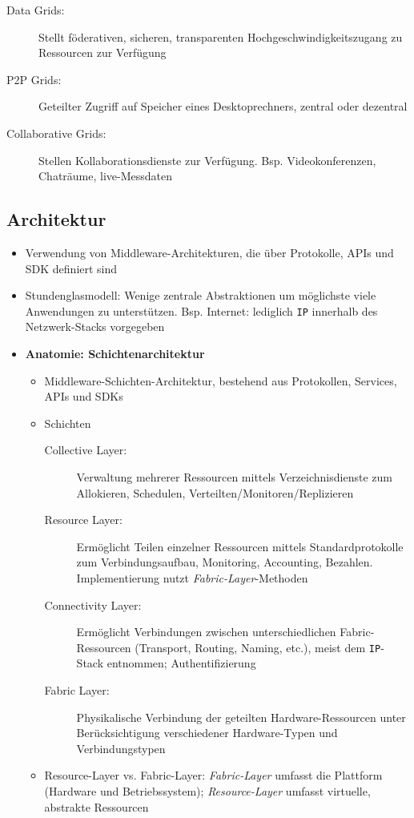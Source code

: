 \begin{itemize}
\begin{description}
		\item[Data Grids:] Stellt föderativen, sicheren, transparenten Hochgeschwindigkeitszugang zu Ressourcen zur Verfügung 
		\item[P2P Grids:] Geteilter Zugriff auf Speicher eines Desktoprechners, zentral oder dezentral
		\item[Collaborative Grids:] Stellen Kollaborationsdienste zur Verfügung. Bsp. Videokonferenzen, Chaträume, live-Messdaten
	\end{description}
\end{itemize}


\subsection{Architektur}
\begin{itemize}
	\item Verwendung von Middleware-Architekturen, die über Protokolle, APIs und SDK definiert sind
	\item Stundenglasmodell: Wenige zentrale Abstraktionen um möglichste viele Anwendungen zu unterstützen. Bsp. Internet: lediglich \texttt{IP} innerhalb des Netzwerk-Stacks vorgegeben
	\item \textbf{Anatomie: Schichtenarchitektur}
	\begin{itemize}
		\item Middleware-Schichten-Architektur, bestehend aus Protokollen, Services, APIs und SDKs
		\item Schichten
		\begin{description}
			\item[Collective Layer:] Verwaltung mehrerer Ressourcen mittels Verzeichnisdienste zum Allokieren, Schedulen, Verteilten/Monitoren/Replizieren
			\item[Resource Layer:] Ermöglicht Teilen einzelner Ressourcen mittels Standardprotokolle zum Verbindungsaufbau, Monitoring, Accounting, Bezahlen. Implementierung nutzt \textit{Fabric-Layer}-Methoden
			\item[Connectivity Layer:] Ermöglicht Verbindungen zwischen unterschiedlichen Fabric-Ressourcen (Transport, Routing, Naming, etc.), meist dem \texttt{IP}-Stack entnommen; Authentifizierung
			\item[Fabric Layer:] Physikalische Verbindung der geteilten Hardware-Ressourcen unter Berücksichtigung verschiedener Hardware-Typen und Verbindungstypen
		\end{description}
		\item Resource-Layer vs. Fabric-Layer: \textit{Fabric-Layer} umfasst die Plattform (Hardware und Betriebssystem); \textit{Resource-Layer} umfasst virtuelle, abstrakte Ressourcen

\end{itemize}
\end{itemize}
